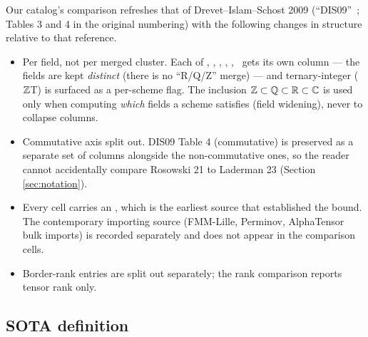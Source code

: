 
Our catalog's comparison refreshes that of Drevet--Islam--Schost 2009
(``DIS09''~\cite{drisc09}; Tables 3 and 4 in the original numbering)
with the following changes in structure relative to that reference.

\begin{itemize}[itemsep=2pt]
  \item Per field, not per merged cluster. Each of \Integers, \Rationals,
    \Reals, \Complex, \Ftwo, \Fthree\ gets its own column --- the fields
    are kept \emph{distinct} (there is no ``R/Q/Z'' merge) --- and ternary-integer
    (\(\mathbb{Z}\)T) is surfaced as a per-scheme flag. The inclusion
    \(\mathbb{Z} \subset \mathbb{Q} \subset \mathbb{R} \subset \mathbb{C}\) is
    used only when computing \emph{which} fields a scheme satisfies (field
    widening), never to collapse columns.
  \item Commutative axis split out. DIS09 Table 4 (commutative)
    is preserved as a separate set of columns alongside the
    non-commutative ones, so the reader cannot accidentally compare
    Rosowski 21 to Laderman 23 (Section \ref{sec:notation}).
  \item Every cell carries an , which is
    the earliest source that established the bound. The
    contemporary importing source (FMM-Lille, Perminov, AlphaTensor
    bulk imports) is recorded separately and does not appear in the
    comparison cells.
  \item Border-rank entries are split out separately; the rank
    comparison reports tensor rank only.
\end{itemize}

\subsection{SOTA definition}\label{ssec:sota}

